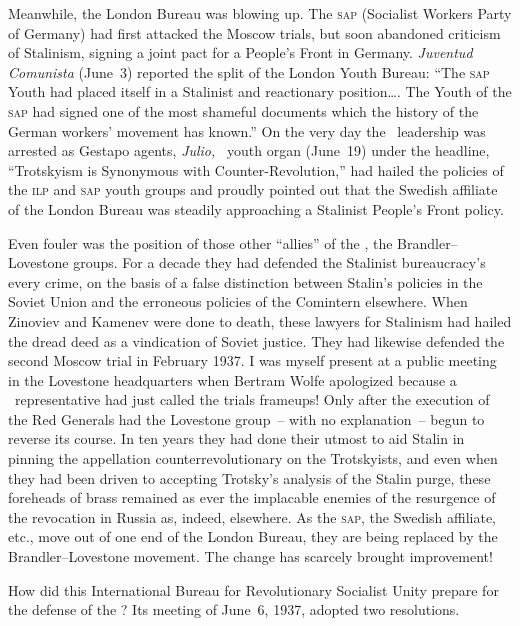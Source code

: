 Meanwhile, the London Bureau was blowing up. The \textsc{sap} (Socialist Workers Party of Germany) had first attacked the Moscow trials, but soon abandoned criticism of Stalinism, signing a joint pact for a People’s Front in Germany. \emph{Juventud Comunista} (June~3) reported the split of the London Youth Bureau: ``The \textsc{sap} Youth had placed itself in a Stalinist and reactionary position\dots. The Youth of the \textsc{sap} had signed one of the most shameful documents which the history of the German workers’ movement has known.\kn\kn'' On the very day the \POUM\ leadership was arrested as Gestapo agents, \emph{Julio,} \PSUC\ youth organ (June~19) under the headline, ``Trotskyism is Synonymous with Counter-Revolution,\kn\kn'' had hailed the policies of the \textsc{ilp} and \textsc{sap} youth groups and proudly pointed out that the Swedish affiliate of the London Bureau was steadily approaching a Stalinist People’s Front policy.

Even fouler was the position of those other ``allies'' of the \POUM\kn, the Brandler–Lovestone groups. For a decade they had defended the Stalinist bureaucracy’s every crime, on the basis of a false distinction between Stalin’s policies in the Soviet Union and the erroneous policies of the Comintern elsewhere. When Zinoviev and Kamenev were done to death, these lawyers for Stalinism had hailed the dread deed as a vindication of Soviet justice. They had likewise defended the second Moscow trial in February 1937. I was myself present at a public meeting in the Lovestone headquarters when Bertram Wolfe apologized because a \POUM\ representative had just called the trials frameups! Only after the execution of the Red Generals had the Lovestone group~-- with no explanation~-- begun to reverse its course. In ten years they had done their utmost to aid Stalin in pinning the appellation counterrevolutionary on the Trotskyists, and even when they had been driven to accepting Trotsky’s analysis of the Stalin purge, these foreheads of brass remained as ever the implacable enemies of the resurgence of the revocation in Russia as, indeed, elsewhere. As the \textsc{sap,} the Swedish affiliate, etc., move out of one end of the London Bureau, they are being replaced by the Brandler–Lovestone movement. The change has scarcely brought improvement!

\medskip

How did this International Bureau for Revolutionary Socialist Unity prepare for the defense of the \POUM? Its meeting of June~6, 1937\kn, adopted two resolutions.

